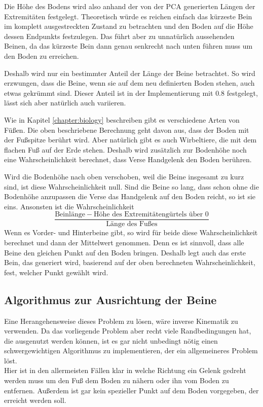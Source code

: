 Die Höhe des Bodens wird also anhand der von der PCA generierten Längen der Extremitäten festgelegt.
Theoretisch würde es reichen einfach das kürzeste Bein im komplett ausgestreckten Zustand zu betrachten und den Boden auf die Höhe dessen Endpunkts festzulegen.
Das führt aber zu unnatürlich aussehenden Beinen, da das kürzeste Bein dann genau senkrecht nach unten führen muss um den Boden zu erreichen.

Deshalb wird nur ein bestimmter Anteil der Länge der Beine betrachtet. So wird erzwungen, dass die Beine, wenn sie auf dem neu definierten Boden stehen, auch etwas gekrümmt sind. Dieser Anteil ist in der Implementierung mit $0.8$ festgelegt, lässt sich aber natürlich auch variieren.

Wie in Kapitel \ref{chapter:biology} beschreiben gibt es verschiedene Arten von Füßen. Die oben beschriebene Berechnung geht davon aus, dass der Boden mit der Fußspitze berührt wird. Aber natürlich gibt es auch Wirbeltiere, die mit dem flachen Fuß auf der Erde stehen.
Deshalb wird zusätzlich zur Bodenhöhe noch eine Wahrscheinlichkeit berechnet, dass Verse \bzw Handgelenk den Boden berühren.

Wird die Bodenhöhe nach oben verschoben, weil die Beine insgesamt zu kurz sind, ist diese Wahrscheinlichkeit null.
Sind die Beine so lang, dass schon ohne die Bodenhöhe anzupassen die Verse \bzw das Handgelenk auf den Boden reicht, so ist sie eins.
Ansonsten ist die Wahrscheinlichkeit 
\[\frac{\text{Beinlänge} - \text{Höhe des Extremitätengürtels über }0}{\text{Länge des Fußes}}\]
Wenn es Vorder- und Hinterbeine gibt, so wird für beide diese Wahrscheinlichkeit berechnet und dann der Mittelwert genommen. Denn es ist sinnvoll, dass alle Beine den gleichen Punkt auf den Boden bringen.
Deshalb legt auch das erste Bein, das generiert wird, basierend auf der oben berechneten Wahrscheinlichkeit, fest, welcher Punkt gewählt wird.


\subsection{Algorithmus zur Ausrichtung der Beine}
\label{leg_algo}

Eine Herangehensweise dieses Problem zu lösen, wäre inverse Kinematik zu verwenden. 
Da das vorliegende Problem aber recht viele Randbedingungen hat, die ausgenutzt werden können, ist es gar nicht unbedingt nötig einen schwergewichtigen Algorithmus zu implementieren, der ein allgemeineres Problem löst.\\
Hier ist \zb in den allermeisten Fällen klar in welche Richtung ein Gelenk gedreht werden muss um den Fuß dem Boden zu nähern oder ihn vom Boden zu entfernen. Außerdem ist gar kein spezieller Punkt auf dem Boden vorgegeben, der erreicht werden soll.

